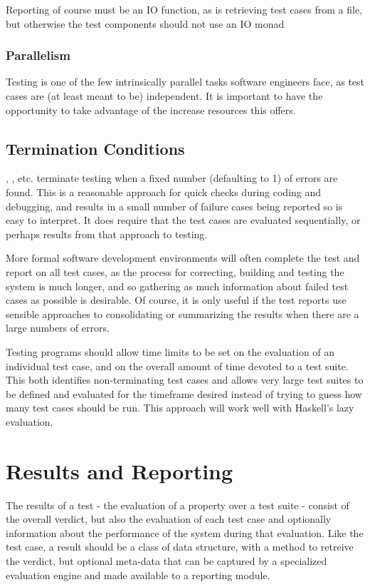 
Reporting of course must be an IO function,
as is retrieving test cases from a file,
but otherwise the test components should not use an IO monad

\subsubsection{Parallelism}
Testing is one of the few intrinsically parallel tasks software engineers face,
as test cases are (at least meant to be) independent.
It is important to have the opportunity to take advantage of the increase resources this offers.

\subsection{Termination Conditions}

\QC, \SC, etc. terminate testing when a fixed number (defaulting to 1) of errors are found.
This is a reasonable approach for quick checks during coding and debugging,
and results in a small number of failure cases being reported so is easy to interpret.
It does require that the test cases are evaluated sequentially,
or perhaps results from that approach to testing.

More formal software development environments
will often complete the test and report on all test cases,
as the process for correcting, building and testing the system is much longer,
and so gathering as much information about failed test cases as possible is desirable.
Of course, it is only useful if the test reports use sensible approaches to 
consolidating or summarizing the results when there are a large numbers of errors.

Testing programs should allow time limits to be set on 
the evaluation of an individual test case,
and on the overall amount of time devoted to a test suite.
This both identifies non-terminating test cases
and allows very large test suites to be defined
and evaluated for the timeframe desired
instead of trying to guess how many test cases should be run.
This approach will work well with Haskell's lazy evaluation.


\section{Results and Reporting}
The results of a test - the evaluation of a property over a test suite - consist of the overall verdict,
but also the evaluation of each test case 
and optionally information about the performance of the system during that evaluation.
Like the test case,
a result should be a class of data structure,
with a method to retreive the verdict,
but optional meta-data that can be captured by a specialized evaluation engine
and made available to a reporting module.

